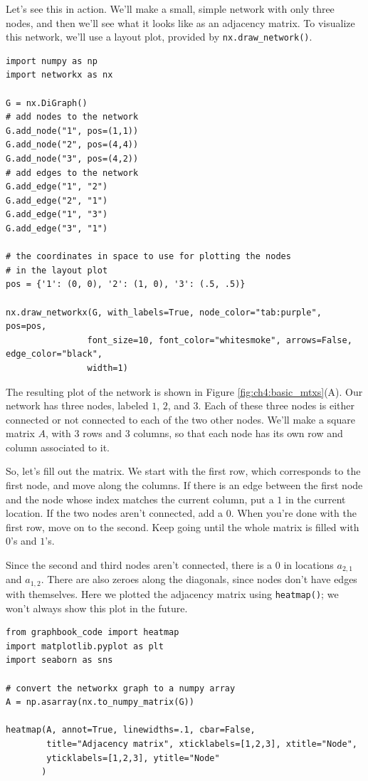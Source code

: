 Let's see this in action. We'll make a small, simple network with only three nodes, and then we'll see what it looks like as an adjacency matrix. To visualize this network, we'll use a layout plot, provided by \texttt{nx.draw\_network()}.

\begin{lstlisting}[style=python]
import numpy as np
import networkx as nx

G = nx.DiGraph()
# add nodes to the network
G.add_node("1", pos=(1,1))
G.add_node("2", pos=(4,4))
G.add_node("3", pos=(4,2))
# add edges to the network
G.add_edge("1", "2")
G.add_edge("2", "1")
G.add_edge("1", "3")
G.add_edge("3", "1")

# the coordinates in space to use for plotting the nodes
# in the layout plot
pos = {'1': (0, 0), '2': (1, 0), '3': (.5, .5)}

nx.draw_networkx(G, with_labels=True, node_color="tab:purple", pos=pos,
                font_size=10, font_color="whitesmoke", arrows=False, edge_color="black",
                width=1)
\end{lstlisting}

The resulting plot of the network is shown in Figure \ref{fig:ch4:basic_mtxs}(A). Our network has three nodes, labeled $1$, $2$, and $3$. Each of these three nodes is either connected or not connected to each of the two other nodes. We'll make a square matrix $A$, with 3 rows and 3 columns, so that each node has its own row and column associated to it.

So, let's fill out the matrix. We start with the first row, which corresponds to the first node, and move along the columns. If there is an edge between the first node and the node whose index matches the current column, put a $1$ in the current location. If the two nodes aren't connected, add a $0$. When you're done with the first row, move on to the second. Keep going until the whole matrix is filled with $0$'s and $1$'s. 

Since the second and third nodes aren't connected, there is a $0$ in locations $a_{2, 1}$ and $a_{1, 2}$. There are also zeroes along the diagonals, since nodes don't have edges with themselves. Here we plotted the adjacency matrix using \texttt{heatmap()}; we won't always show this plot in the future. 

\begin{lstlisting}[style=python]
from graphbook_code import heatmap
import matplotlib.pyplot as plt
import seaborn as sns

# convert the networkx graph to a numpy array
A = np.asarray(nx.to_numpy_matrix(G))

heatmap(A, annot=True, linewidths=.1, cbar=False, 
        title="Adjacency matrix", xticklabels=[1,2,3], xtitle="Node", 
        yticklabels=[1,2,3], ytitle="Node"
       )


\end{lstlisting}


